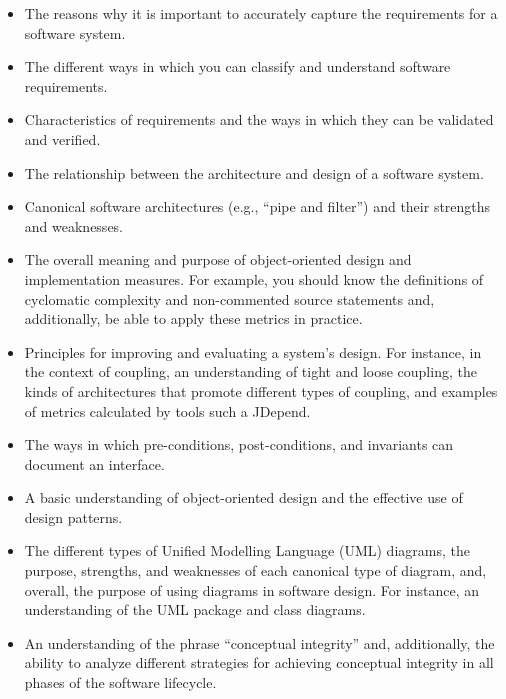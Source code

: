 \begin{itemize}
  \item The reasons why it is important to accurately capture the requirements for a software system.

  \item The different ways in which you can classify and understand software requirements.

  \item Characteristics of requirements and the ways in which they can be validated and verified.

  \item The relationship between the architecture and design of a software system.

  \item Canonical software architectures (e.g., ``pipe and filter'') and their strengths and weaknesses.

  \item The overall meaning and purpose of object-oriented design and implementation measures. For example, you should
    know the definitions of cyclomatic complexity and non-commented source statements and, additionally, be
    able to apply these metrics in practice.

  \item Principles for improving and evaluating a system's design. For instance, in the context of coupling, an
    understanding of tight and loose coupling, the kinds of architectures that promote different types of coupling, and
    examples of metrics calculated by tools such a JDepend.

  \item The ways in which pre-conditions, post-conditions, and invariants can document an interface.

  \item A basic understanding of object-oriented design and the effective use of design patterns.

  \item The different types of Unified Modelling Language (UML) diagrams, the purpose, strengths, and weaknesses of each
    canonical type of diagram, and, overall, the purpose of using diagrams in software design. For instance, an
    understanding of the UML package and class diagrams.

  \item An understanding of the phrase ``conceptual integrity'' and, additionally, the ability to analyze different
    strategies for achieving conceptual integrity in all phases of the software lifecycle.


\end{itemize}
